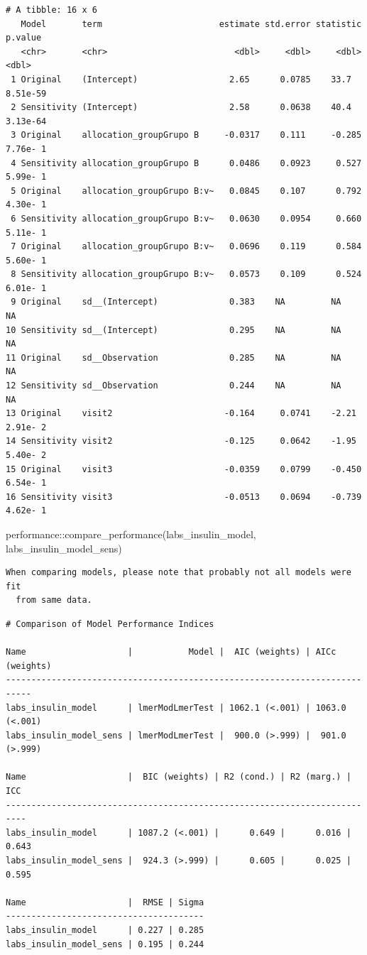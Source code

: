 \documentclass[
  letterpaper,
  DIV=11,
  numbers=noendperiod]{scrartcl}
\newenvironment{Shaded}{\begin{snugshade}}{\end{snugshade}}
\newcommand{\FunctionTok}[1]{\textcolor[rgb]{0.28,0.35,0.67}{#1}}
\newcommand{\NormalTok}[1]{\textcolor[rgb]{0.00,0.23,0.31}{#1}}
\newcommand{\SpecialCharTok}[1]{\textcolor[rgb]{0.37,0.37,0.37}{#1}}
\begin{document}
\begin{verbatim}
# A tibble: 16 x 6
   Model       term                       estimate std.error statistic   p.value
   <chr>       <chr>                         <dbl>     <dbl>     <dbl>     <dbl>
 1 Original    (Intercept)                  2.65      0.0785    33.7    8.51e-59
 2 Sensitivity (Intercept)                  2.58      0.0638    40.4    3.13e-64
 3 Original    allocation_groupGrupo B     -0.0317    0.111     -0.285  7.76e- 1
 4 Sensitivity allocation_groupGrupo B      0.0486    0.0923     0.527  5.99e- 1
 5 Original    allocation_groupGrupo B:v~   0.0845    0.107      0.792  4.30e- 1
 6 Sensitivity allocation_groupGrupo B:v~   0.0630    0.0954     0.660  5.11e- 1
 7 Original    allocation_groupGrupo B:v~   0.0696    0.119      0.584  5.60e- 1
 8 Sensitivity allocation_groupGrupo B:v~   0.0573    0.109      0.524  6.01e- 1
 9 Original    sd__(Intercept)              0.383    NA         NA     NA       
10 Sensitivity sd__(Intercept)              0.295    NA         NA     NA       
11 Original    sd__Observation              0.285    NA         NA     NA       
12 Sensitivity sd__Observation              0.244    NA         NA     NA       
13 Original    visit2                      -0.164     0.0741    -2.21   2.91e- 2
14 Sensitivity visit2                      -0.125     0.0642    -1.95   5.40e- 2
15 Original    visit3                      -0.0359    0.0799    -0.450  6.54e- 1
16 Sensitivity visit3                      -0.0513    0.0694    -0.739  4.62e- 1
\end{verbatim}

\begin{Shaded}
\begin{Highlighting}[]
\NormalTok{performance}\SpecialCharTok{::}\FunctionTok{compare\_performance}\NormalTok{(labs\_insulin\_model, labs\_insulin\_model\_sens)}
\end{Highlighting}
\end{Shaded}

\begin{verbatim}
When comparing models, please note that probably not all models were fit
  from same data.
\end{verbatim}

\begin{verbatim}
# Comparison of Model Performance Indices

Name                    |           Model |  AIC (weights) | AICc (weights)
---------------------------------------------------------------------------
labs_insulin_model      | lmerModLmerTest | 1062.1 (<.001) | 1063.0 (<.001)
labs_insulin_model_sens | lmerModLmerTest |  900.0 (>.999) |  901.0 (>.999)

Name                    |  BIC (weights) | R2 (cond.) | R2 (marg.) |   ICC
--------------------------------------------------------------------------
labs_insulin_model      | 1087.2 (<.001) |      0.649 |      0.016 | 0.643
labs_insulin_model_sens |  924.3 (>.999) |      0.605 |      0.025 | 0.595

Name                    |  RMSE | Sigma
---------------------------------------
labs_insulin_model      | 0.227 | 0.285
labs_insulin_model_sens | 0.195 | 0.244
\end{verbatim}
\end{document}
